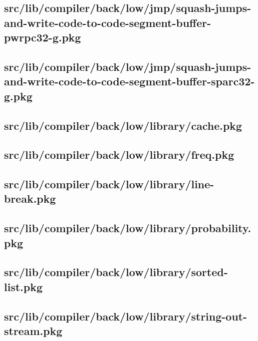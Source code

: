 \subsection{src/lib/compiler/back/low/jmp/squash-jumps-and-write-code-to-code-segment-buffer-pwrpc32-g.pkg}


\subsection{src/lib/compiler/back/low/jmp/squash-jumps-and-write-code-to-code-segment-buffer-sparc32-g.pkg}


\subsection{src/lib/compiler/back/low/library/cache.pkg}


\subsection{src/lib/compiler/back/low/library/freq.pkg}


\subsection{src/lib/compiler/back/low/library/line-break.pkg}


\subsection{src/lib/compiler/back/low/library/probability.pkg}


\subsection{src/lib/compiler/back/low/library/sorted-list.pkg}


\subsection{src/lib/compiler/back/low/library/string-out-stream.pkg}


